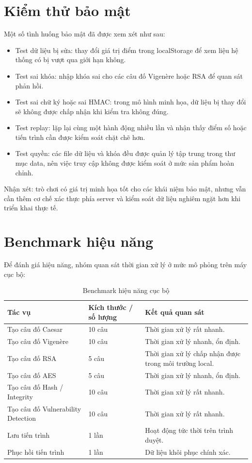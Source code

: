 \section{Kiểm thử bảo mật}

Một số tình huống bảo mật đã được xem xét như sau:

\begin{itemize}
    \item Test dữ liệu bị sửa: thay đổi giá trị điểm trong localStorage để xem liệu hệ thống có bị vượt qua giới hạn không.
    \item Test sai khóa: nhập khóa sai cho các câu đố Vigenère hoặc RSA để quan sát phản hồi.
    \item Test sai chữ ký hoặc sai HMAC: trong mô hình minh họa, dữ liệu bị thay đổi sẽ không được chấp nhận khi kiểm tra không đúng.
    \item Test replay: lặp lại cùng một hành động nhiều lần và nhận thấy điểm số hoặc tiến trình cần được kiểm soát chặt chẽ hơn.
    \item Test quyền: các file dữ liệu và khóa đều được quản lý tập trung trong thư mục data, nên việc truy cập không được kiểm soát ở mức sản phẩm hoàn chỉnh.
\end{itemize}

Nhận xét: trò chơi có giá trị minh họa tốt cho các khái niệm bảo mật, nhưng vẫn cần thêm cơ chế xác thực phía server và kiểm soát dữ liệu nghiêm ngặt hơn khi triển khai thực tế.

\section{Benchmark hiệu năng}

Để đánh giá hiệu năng, nhóm quan sát thời gian xử lý ở mức mô phỏng trên máy cục bộ:

\begin{table}[H]
\centering
\caption{Benchmark hiệu năng cục bộ}
\label{tab:benchmark}
\begin{tabular}{|p{4cm}|p{4cm}|p{4cm}|}
\hline
\textbf{Tác vụ} & \textbf{Kích thước / số lượng} & \textbf{Kết quả quan sát} \\ \hline
Tạo câu đố Caesar & 10 câu & Thời gian xử lý rất nhanh. \\ \hline
Tạo câu đố Vigenère & 10 câu & Thời gian xử lý nhanh, ổn định. \\ \hline
Tạo câu đố RSA & 5 câu & Thời gian xử lý chấp nhận được trong môi trường local. \\ \hline
Tạo câu đố AES & 5 câu & Thời gian xử lý nhanh, ổn định. \\ \hline
Tạo câu đố Hash / Integrity & 10 câu & Thời gian xử lý rất nhanh. \\ \hline
Tạo câu đố Vulnerability Detection & 10 câu & Thời gian xử lý rất nhanh. \\ \hline
Lưu tiến trình & 1 lần & Hoạt động tức thời trên trình duyệt. \\ \hline
Phục hồi tiến trình & 1 lần & Dữ liệu khôi phục chính xác. \\ \hline
\end{tabular}
\end{table}

